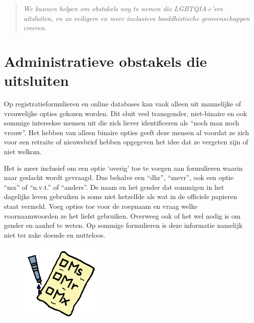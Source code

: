 \documentclass[12pt,openany]{book}
\begin{document}
\begin{quote}
\textit{We kunnen helpen om obstakels weg te nemen die LGBTQIA+’ers uitsluiten, en zo veiligere en meer inclusieve boeddhistische gemeenschappen creeren.}
\end{quote}

\section*{Administratieve obstakels die uitsluiten}

Op registratieformulieren en online databases kan vaak alleen uit mannelijke of vrouwelijke opties gekozen worden.  Dit sluit veel transgender, niet-binaire en ook sommige intersekse mensen uit die zich liever identificeren als “noch man noch vrouw”. Het hebben van alleen binaire opties geeft deze mensen al voordat ze zich voor een retraite of nieuwsbrief hebben opgegeven het idee dat ze vergeten zijn of niet welkom.

Het is meer inclusief om een optie ‘overig’ toe te voegen aan formulieren waarin naar geslacht wordt gevraagd. Dus behalve een “dhr”, “mevr”, ook een optie “mx” of “n.v.t.” of “anders”. De naam en het gender dat sommigen in het dagelijks leven gebruiken is soms niet hetzelfde als wat in de officiele papieren staat vermeld. Voeg opties toe voor de roepnaam en vraag welke voornaamwoorden ze het liefst gebruiken. Overweeg ook of het wel nodig is om gender en aanhef te weten. Op sommige formulieren is deze informatie namelijk niet ter zake doende en nutteloos.

\begin{figure}[h]
\includegraphics[width=4cm]{15.png}
\centering
\end{figure}
\end{document}
